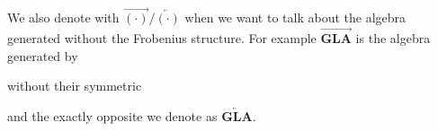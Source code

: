 \begin{definition}\label{def:arrows}
	We also denote with $\overrightarrow{(\cdot)}/\overleftarrow{(\cdot)}$ when we want to talk about the algebra generated without the Frobenius structure. For example $\overrightarrow{\textbf{GLA}}$ is the algebra generated by
	\begin{figure}[H]
		\centering
		
	\end{figure}
	without their symmetric
	\begin{figure}[H]
		\centering
		
	\end{figure}
	and the exactly opposite we denote as $\overleftarrow{\textbf{GLA}}$.
\end{definition}

